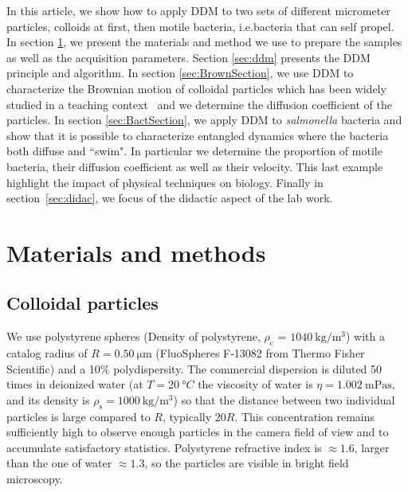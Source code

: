 \documentclass[prb,twocolumn,amsmath,amssymb]{revtex4-1}
\begin{document}
In this article, we show how to apply DDM to two sets of different micrometer particles, colloids at first, then motile bacteria, i.e.bacteria that can self propel. In section \ref{sec:materials}, we present the materials and method we use to prepare the samples as well as the acquisition parameters. Section \ref{sec:ddm} presents the DDM principle and algorithm. In section \ref{sec:BrownSection}, we use DDM to characterize the Brownian motion of colloidal particles which has been widely studied in a teaching context~\cite{ajp1997lemons, ajp2006newburgh, ajp2006bergstein} and we determine the diffusion coefficient of the particles. In section \ref{sec:BactSection}, we apply DDM to \textit{salmonella} bacteria and show that it is possible to characterize entangled dynamics where the bacteria both diffuse and ``swim". In particular we determine the proportion of motile bacteria, their diffusion coefficient as well as their velocity. This last example highlight the impact of physical techniques on biology. Finally in section~\ref{sec:didac}, we focus of the didactic aspect of the lab work.

\section{Materials and methods}
\label{sec:materials}
\subsection{Colloidal particles}

We use polystyrene spheres (Density of polystyrene, $\rho_\text{c}$ = $\SI{1040}{\kilogram\per\meter\cubed}$) with a catalog radius of $R=\SI{0.50}{\micro\meter}$  (FluoSpheres\circledR{} F-13082 from Thermo Fisher Scientific) and a 10\% polydispersity. The commercial dispersion is diluted 50 times in deionized water (at $T=\SI{20}{\degree C}$ the viscosity of water is $\eta =\SI{1.002}{\milli\pascal\second}$, and its density is $\rho_\text{s}=\SI{1000}{\kilogram\per\meter\cubed}$) so that the distance between two individual particles is large compared to $R$, typically $20 R$. This concentration remains sufficiently high to observe enough particles in the camera field of view and to accumulate satisfactory statistics. Polystyrene refractive index is $\approx 1.6$, larger than the one of water $\approx 1.3$, so the particles are visible in bright field microscopy.
\end{document}
